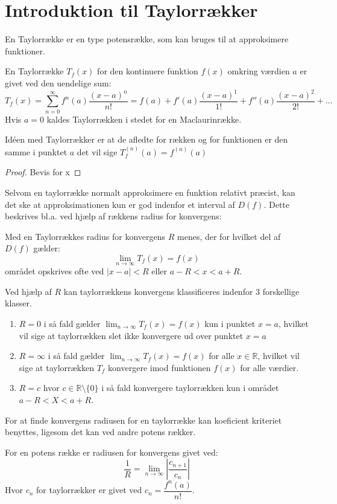 \chapter{Introduktion til Taylorrækker}
\label{ch:tr}
En Taylorrække er en type potensrække, som kan bruges til at approksimere funktioner.
\begin{defn}
    En Taylorrække $T_f(x)$ for den kontinuere funktion $f(x)$ omkring værdien $a$ er givet ved den uendelige sum:
    \[
        T_f(x) = \sum^{\infty}_{n=0} f^n(a) \frac{(x-a)^{n}}{n!} = f(a) + f'(a) \frac{(x-a)^{1}}{1!} + 
        f''(a) \frac{(x-a)^{2}}{2!} + \ldots
    \]
    Hvis $a = 0$ kaldes Taylorrækken i stedet for en Maclaurinrække.
\end{defn}
\label{def:taylorrække}
Idéen med Taylorrækker er at de afledte for rækken og for funktionen er den samme i punktet $a$ det vil sige
$T_f^{(n)}(a) = f^{(n)}(a)$  %
\begin{proof}
    Bevis for x
\end{proof}
Selvom en taylorrække normalt approksimere en funktion relativt præcist, kan det ske at
approksimationen kun er god indenfor et interval af $D(f)$. Dette beskrives bl.a. ved hjælp af rækkens
radius for konvergens:
\begin{defn} %
    Med en Taylorrækkes radius for konvergens $R$ menes, der for hvilket del af $D(f)$ gælder:
    \[
        \lim_{n \rightarrow \infty} T_f(x) = f(x)
    \]
    området opskrives ofte ved $|x-a| < R$ eller $a - R < x < a + R$.
\end{defn}
Ved hjælp af $R$ kan taylorrækkens konvergens klassificeres indenfor 3 forskellige klasser.
\begin{enumerate} %
    \item $R = 0$ i så fald gælder $\lim_{n \rightarrow \infty} T_f(x) = f(x)$ kun i punktet $x = a$,
    hvilket vil sige at taylorrækken slet ikke konvergere ud over punktet $x = a$
    \item $R = \infty$ i så fald gælder $\lim_{n \rightarrow \infty} T_f(x) = f(x)$ for alle $x \in \mathbb{R}$,
    hvilket vil sige at taylorrækken $T_f$ konvergere imod funktionen $f(x)$ for alle værdier.
    \item $R = c$ hvor $c \in \mathbb{R}\setminus\{0\}$ i så fald konvergere taylorrækken kun i området $a - R < X < a + R$.
\end{enumerate}
For at finde konvergens radiusen for en taylorrække kan koeficient kriteriet benyttes, ligesom det kan ved andre potens rækker.
\begin{defn} %
    For en potens række er radiusen for konvergens givet ved:
    \[
        \frac{1}{R} = \lim_{n \rightarrow \infty} \left\lvert \frac{c_{n + 1}}{c_n} \right\lvert
    \]
    Hvor $c_n$ for taylorrækker er givet ved $c_n = \dfrac{f^n(a)}{n!}$.
\end{defn} %

